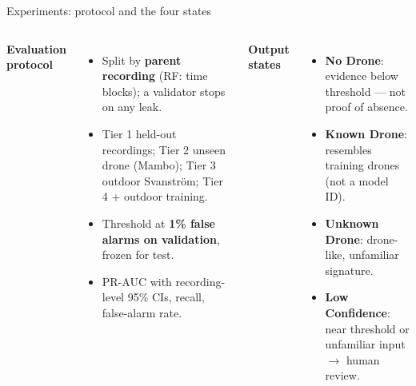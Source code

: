 \documentclass[aspectratio=169,11pt]{beamer}
\begin{document}
\begin{frame}{Experiments: protocol and the four states}
\begin{columns}[T]
\textbf{Evaluation protocol}
\begin{itemize}\small
  \item Split by \textbf{parent recording} (RF: time blocks); a validator stops on any leak.
  \item Tier 1 held-out recordings; Tier 2 unseen drone (Mambo); Tier 3 outdoor Svanstr\"om;
        Tier 4 + outdoor training.
  \item Threshold at \textbf{1\% false alarms on validation}, frozen for test.
  \item PR-AUC with recording-level 95\% CIs, recall, false-alarm rate.
\end{itemize}
\textbf{Output states}
\begin{itemize}\small
  \item[\textcolor{nogray}{$\bullet$}] \textbf{No Drone}: evidence below threshold --- not proof of absence.
  \item[\textcolor{dronered}{$\bullet$}] \textbf{Known Drone}: resembles training drones (not a model ID).
  \item[\textcolor{unkviolet}{$\bullet$}] \textbf{Unknown Drone}: drone-like, unfamiliar signature.
  \item[\textcolor{lowamber}{$\bullet$}] \textbf{Low Confidence}: near threshold or unfamiliar input $\rightarrow$ human review.
\end{itemize}
\end{columns}
\end{frame}
\end{document}
